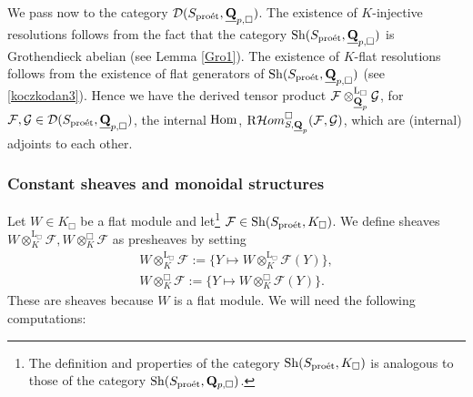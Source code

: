 \documentclass[10pt]{amsart}
\let\cal\mathcal
\theoremstyle{definition}
\theoremstyle{remark}
\newcommand{\proeet}{\operatorname{pro\acute{e}t} }
\newcommand{\Hom}{{\rm{Hom}} }
\newcommand{\Hhom}{{\cal Hom}}
\newcommand{\LL}{\operatorname{L} }
\newcommand{\sff}{{\mathcal{F}}}
\newcommand{\sg}{{\mathcal{G}}}
\newcommand{\sd}{{\mathcal{D}}}
\numberwithin{equation}{section}
\def\R{{\mathrm R}}
\def\Q{{\bf Q}} \def\Z{{\bf Z}}
\numberwithin{equation}{section}
\begin{document}
 
   We pass now to the category $\sd(S_{\proeet},\underline{\Q}_{p,\Box})$.  The existence of  $K$-injective  resolutions follows from the fact that the  category 
   ${\rm Sh}(S_{\proeet},\underline{\Q}_{p,\Box})$ is Grothendieck abelian (see Lemma \ref{Gro1}). The existence of  $K$-flat resolutions
 follows  from the existence of flat generators of ${\rm Sh}(S_{\proeet},\underline{\Q}_{p,\Box})$ (see   \eqref{koczkodan3}).
 Hence we have  the derived tensor product 
  $\sff\otimes^{\LL_{\Box}}_{\underline{\Q}_p}\sg$, for $\sff, \sg\in\sd(S_{\proeet},{\underline{\Q}_{p,\Box}})$, the internal $\Hom$, $\R\Hhom^{\Box}_{S,\underline{\Q}_p}(\sff,\sg)$, which are (internal) adjoints to each other.    
  

\subsubsection{Constant sheaves and monoidal structures}
Let $W\in K_{\Box}$ be a flat module and let\footnote{The definition and properties of the category ${\rm Sh}(S_{\proeet}, K_{\Box})$ is analogous to those of the category 
$ {\rm Sh}(S_{\proeet}, \Q_{p,\Box})$.}  $\sff\in {\rm Sh}(S_{\proeet}, K_{\Box})$.  We define  sheaves $  W\otimes^{\LL_{\Box}}_{K}\sff,   W\otimes^{\Box}_{K}\sff$  as presheaves by setting
  \begin{align*}
  W\otimes^{\LL_{\Box}}_{K}\sff:=\{Y\mapsto W\otimes^{\LL_{\Box}}_{K}\sff(Y)\},\\
    W\otimes^{\Box}_{K}\sff:=\{Y\mapsto W\otimes^{\Box}_{K}\sff(Y)\}.
  \end{align*}
  These are sheaves because $W$ is a flat module. We will need the following computations:
\end{document}
